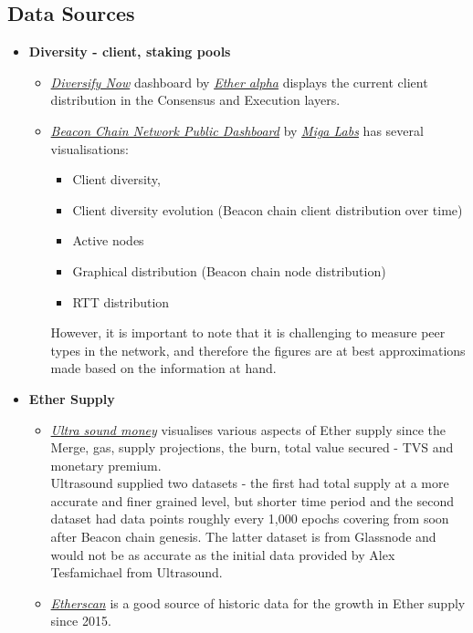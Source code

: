 \documentclass[UTF8]{article}
\begin{document}
\subsection{Data Sources}
\label{sec:sources}
\begin{itemize}
	\item \textbf{Diversity - client, staking pools}
	\begin{itemize}
		\item \textit{\href{https://clientdiversity.org/}{Diversify Now}} dashboard by \textit{\href{https://etheralpha.org/}{Ether alpha}} displays the current client distribution in the Consensus and Execution layers.
		\item \textit{\href{https://migalabs.es/beaconnodes}{Beacon Chain Network Public Dashboard}} by \textit{\href{https://migalabs.es/}{Miga Labs}} has several visualisations: 
		\begin{itemize}
		\item Client diversity,  
		\item Client diversity evolution (Beacon chain client distribution over time)
		\item Active nodes
		\item Graphical distribution (Beacon chain node distribution)
		\item RTT distribution
	\end{itemize}
However, it is important to note that it is challenging to measure peer types in the network, and therefore the figures are at best approximations made based on the information at hand. 
	\end{itemize}
        \item \textbf{Ether Supply}
        \begin{itemize}
		\item \textit{\href{https://ultrasound.money/}{Ultra sound money}} visualises various aspects of Ether supply since the Merge, gas, supply projections, the burn, total value secured - TVS and monetary premium. \\
Ultrasound supplied two datasets - the first had total supply at a more accurate and finer grained level, but shorter time period and the second dataset had data points roughly every 1,000 epochs covering from soon after Beacon chain genesis. The latter dataset is from Glassnode and would not be as accurate as the initial data provided by Alex Tesfamichael from Ultrasound.
		\item \textit{\href{https://etherscan.io/chart/ethersupplygrowth}{Etherscan}} is a good source of historic data for the growth in Ether supply since 2015.

\end{itemize}
\end{itemize}
\end{document}
